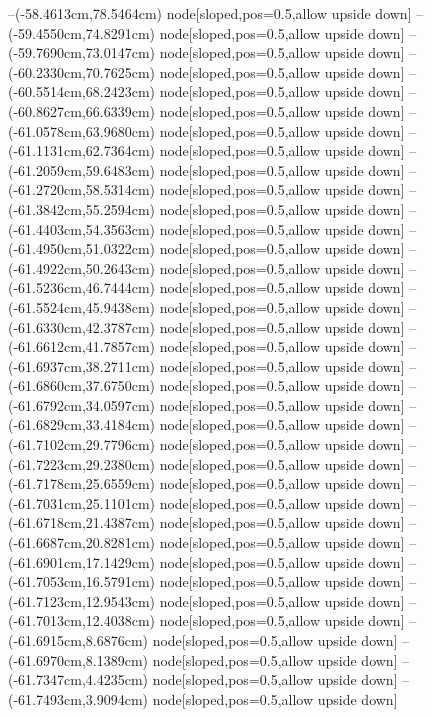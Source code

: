 --(-58.4613cm,78.5464cm) node[sloped,pos=0.5,allow upside down]{\arrowIn}
--(-59.4550cm,74.8291cm) node[sloped,pos=0.5,allow upside down]{\ArrowIn}
--(-59.7690cm,73.0147cm) node[sloped,pos=0.5,allow upside down]{\ArrowIn}
--(-60.2330cm,70.7625cm) node[sloped,pos=0.5,allow upside down]{\ArrowIn}
--(-60.5514cm,68.2423cm) node[sloped,pos=0.5,allow upside down]{\ArrowIn}
--(-60.8627cm,66.6339cm) node[sloped,pos=0.5,allow upside down]{\ArrowIn}
--(-61.0578cm,63.9680cm) node[sloped,pos=0.5,allow upside down]{\ArrowIn}
--(-61.1131cm,62.7364cm) node[sloped,pos=0.5,allow upside down]{\ArrowIn}
--(-61.2059cm,59.6483cm) node[sloped,pos=0.5,allow upside down]{\ArrowIn}
--(-61.2720cm,58.5314cm) node[sloped,pos=0.5,allow upside down]{\ArrowIn}
--(-61.3842cm,55.2594cm) node[sloped,pos=0.5,allow upside down]{\ArrowIn}
--(-61.4403cm,54.3563cm) node[sloped,pos=0.5,allow upside down]{\arrowIn}
--(-61.4950cm,51.0322cm) node[sloped,pos=0.5,allow upside down]{\ArrowIn}
--(-61.4922cm,50.2643cm) node[sloped,pos=0.5,allow upside down]{\arrowIn}
--(-61.5236cm,46.7444cm) node[sloped,pos=0.5,allow upside down]{\ArrowIn}
--(-61.5524cm,45.9438cm) node[sloped,pos=0.5,allow upside down]{\arrowIn}
--(-61.6330cm,42.3787cm) node[sloped,pos=0.5,allow upside down]{\ArrowIn}
--(-61.6612cm,41.7857cm) node[sloped,pos=0.5,allow upside down]{\arrowIn}
--(-61.6937cm,38.2711cm) node[sloped,pos=0.5,allow upside down]{\ArrowIn}
--(-61.6860cm,37.6750cm) node[sloped,pos=0.5,allow upside down]{\arrowIn}
--(-61.6792cm,34.0597cm) node[sloped,pos=0.5,allow upside down]{\ArrowIn}
--(-61.6829cm,33.4184cm) node[sloped,pos=0.5,allow upside down]{\arrowIn}
--(-61.7102cm,29.7796cm) node[sloped,pos=0.5,allow upside down]{\ArrowIn}
--(-61.7223cm,29.2380cm) node[sloped,pos=0.5,allow upside down]{\arrowIn}
--(-61.7178cm,25.6559cm) node[sloped,pos=0.5,allow upside down]{\ArrowIn}
--(-61.7031cm,25.1101cm) node[sloped,pos=0.5,allow upside down]{\arrowIn}
--(-61.6718cm,21.4387cm) node[sloped,pos=0.5,allow upside down]{\ArrowIn}
--(-61.6687cm,20.8281cm) node[sloped,pos=0.5,allow upside down]{\arrowIn}
--(-61.6901cm,17.1429cm) node[sloped,pos=0.5,allow upside down]{\ArrowIn}
--(-61.7053cm,16.5791cm) node[sloped,pos=0.5,allow upside down]{\arrowIn}
--(-61.7123cm,12.9543cm) node[sloped,pos=0.5,allow upside down]{\ArrowIn}
--(-61.7013cm,12.4038cm) node[sloped,pos=0.5,allow upside down]{\arrowIn}
--(-61.6915cm,8.6876cm) node[sloped,pos=0.5,allow upside down]{\ArrowIn}
--(-61.6970cm,8.1389cm) node[sloped,pos=0.5,allow upside down]{\arrowIn}
--(-61.7347cm,4.4235cm) node[sloped,pos=0.5,allow upside down]{\ArrowIn}
--(-61.7493cm,3.9094cm) node[sloped,pos=0.5,allow upside down]{\arrowIn}
